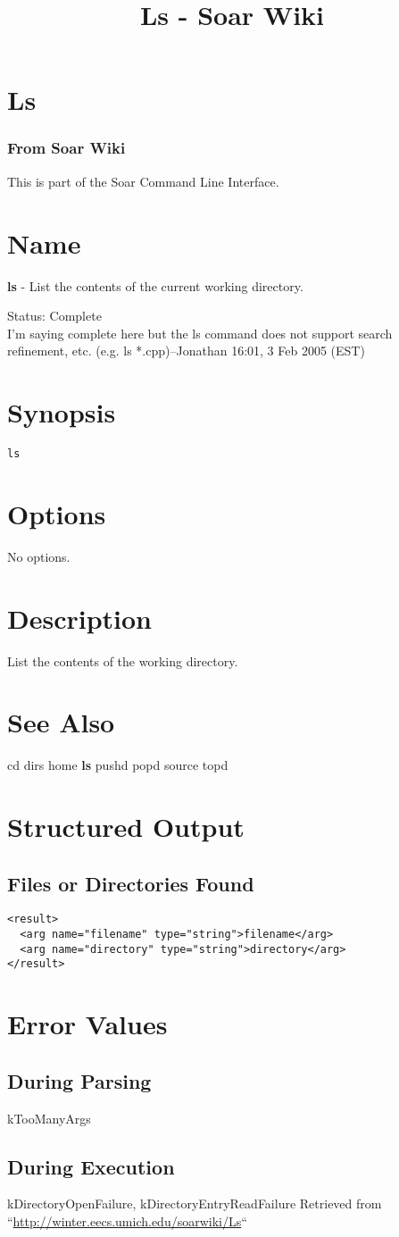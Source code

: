 \documentclass[10pt]{article}
\title{Ls - Soar Wiki}
\begin{document}
\section*{Ls}
\subsubsection*{From Soar Wiki}


 This is part of the Soar Command Line Interface. 
\section*{ Name }


 \textbf{ls}
 - List the contents of the current working directory. 


 Status: Complete\\ 
I'm saying complete here but the ls command does not support search refinement, etc. (e.g. ls *.cpp)--Jonathan 16:01, 3 Feb 2005 (EST) 
\section*{ Synopsis }
\begin{verbatim}
ls

\end{verbatim}
\section*{ Options }


 No options. 
\section*{ Description }


 List the contents of the working directory. 
\section*{ See Also }
\begin{description}
cd dirs home \textbf{ls}
 pushd popd source topd

\end{description}
\section*{ Structured Output }
\subsection*{ Files or Directories Found }
\begin{verbatim}
<result>
  <arg name="filename" type="string">filename</arg>
  <arg name="directory" type="string">directory</arg>
</result>

\end{verbatim}
\section*{ Error Values }
\subsection*{ During Parsing }


 kTooManyArgs
\subsection*{ During Execution }


 kDirectoryOpenFailure, kDirectoryEntryReadFailure Retrieved from ``\url{http://winter.eecs.umich.edu/soarwiki/Ls}``
\end{document}
